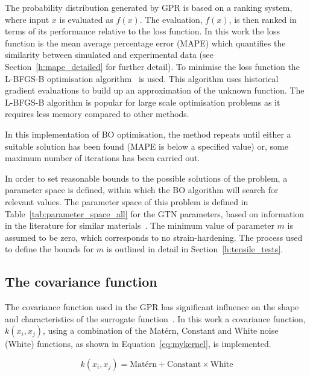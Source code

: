 \documentclass[preprint, review, 12pt]{elsarticle}
\begin{document}
	The probability distribution generated by GPR is based on a ranking system, where input $x$ is evaluated as $f(x)$.
	The evaluation, $f(x)$, is then ranked in terms of its performance relative to the loss function.
	In this work the loss function is the mean average percentage error (MAPE) which quantifies the similarity between simulated and experimental data (see Section~\ref{h:mape_detailed} for further detail).
	To minimise the loss function the L-BFGS-B optimisation algorithm~\cite{ZHU1997} is used.
	This algorithm uses historical gradient evaluations to build up an approximation of the unknown function.
	The L-BFGS-B algorithm is popular for large scale optimisation problems as it requires less memory compared to other methods.

	In this implementation of BO optimisation, the method repeats until either a suitable solution has been found (MAPE is below a specified value) or, some maximum number of iterations has been carried out.

	In order to set reasonable bounds to the possible solutions of the problem, a parameter space is defined, within which the BO algorithm will search for relevant values.
	The parameter space of this problem is defined in Table~\ref{tab:parameter_space_all} for the GTN parameters, based on information in the literature for similar materials~\cite{KIRAN2014,MEADE2020,DASSAULT2021}.
	The minimum value of parameter $m$ is assumed to be zero, which corresponds to no strain-hardening.
	The process used to define the bounds for $m$ is outlined in detail in Section~\ref{h:tensile_tests}.

	


	\subsection{The covariance function}
		\label{h:covariance_function}

		The covariance function used in the GPR has significant influence on the shape and characteristics of the surrogate function~\cite{MONGAN2022}.
		In this work a covariance function, $k(x_i, x_j)$, using a combination of the Mat\'ern, Constant and White noise (White) functions, as shown in Equation~\ref{eq:mykernel}, is implemented.

		\begin{equation}
			k(x_i, x_j) = \text{Mat\'ern} + \text{Constant} \times \text{White}
			\label{eq:mykernel}
		\end{equation}
\end{document}
